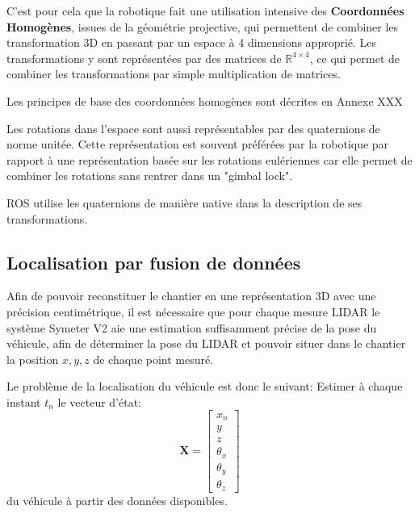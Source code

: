 \documentclass[12pt,a4paper]{report}
\begin{document}
		\para C'est pour cela que la robotique fait une utilisation intensive des \textbf{Coordonnées Homogènes}, issues de la géométrie projective, qui permettent de combiner les transformation 3D en passant par un espace à 4 dimensions approprié. Les transformations y sont représentées par des matrices de $\mathbb{R}^{4 \times 4}$, ce qui permet de combiner les transformations par simple multiplication de matrices.
		
		\para Les principes de base des coordonnées homogènes sont décrites en Annexe XXX 
		
		\para Les rotations dans l'espace sont aussi représentables par des quaternions de norme unitée. Cette représentation est souvent préférées par la robotique par rapport à une représentation basée sur les rotations eulériennes car elle permet de combiner les rotations sans rentrer dans un "gimbal lock". 
		
		\para ROS utilise les quaternions de manière native dans la description de ses transformations. 
		
			
		\subsection{Localisation par fusion de données}
		\label{intro-loc-fusion-donnees}
		
		Afin de pouvoir reconstituer le chantier en une représentation 3D avec une précision centimétrique, il est nécessaire que pour chaque mesure LIDAR le système Symeter V2 aie une estimation suffisamment précise de la pose du véhicule, afin de déterminer la pose du LIDAR et pouvoir situer dans le chantier la position $x,y,z$ de chaque point mesuré.
		
		\para Le problème de la localisation du véhicule est donc le suivant:
		\para Estimer à chaque instant $t_n$ le vecteur d'état:
		\begin{equation}
		\mathbf{X} = \begin{bmatrix}
			x_n \\ y \\ z \\ \theta_x \\ \theta_y \\ \theta_z
		\end{bmatrix}
		\end{equation}
		du véhicule à partir des données disponibles.
		
		
\end{document}
